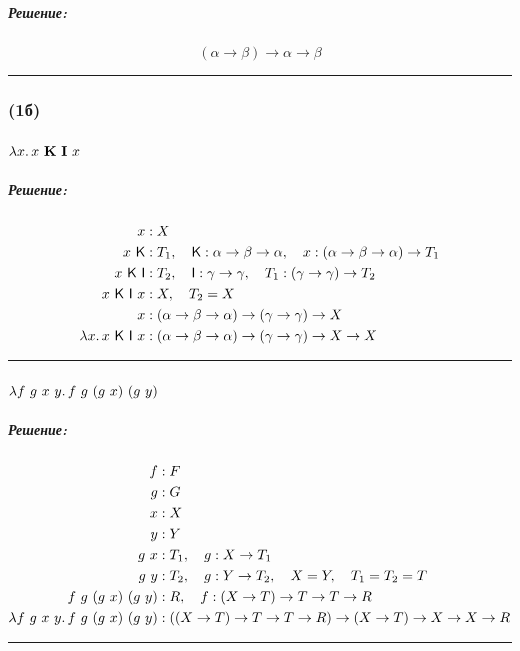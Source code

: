 \documentclass{article}
\newenvironment{proof}{\subparagraph{\hspace{-1em}Решение:\newline}}{\par\noindent\rule{\textwidth}{0.4pt}}
\newcommand{\term}[1]{\mathbf{#1}}
\newcommand{\ap}{~}
\begin{document}
    \begin{proof}
        \[
            (\alpha \to \beta) \to \alpha \to \beta
        \]
    \end{proof}

    \subsubsection{(1б)}

    \paragraph{} $\lambda x\ldotp x \ap \term{K} \ap \term{I} \ap x$

    \begin{proof}
        \[
            \begin{aligned}
                x & : X \\
                x\ \mathsf{K} & : T_1, \quad \mathsf{K} : \alpha \to \beta \to \alpha, \quad x : (\alpha \to \beta \to \alpha) \to T_1 \\
                x\ \mathsf{K}\ \mathsf{I} & : T_2, \quad \mathsf{I} : \gamma \to \gamma, \quad T_1 : (\gamma \to \gamma) \to T_2 \\
                x\ \mathsf{K}\ \mathsf{I}\ x & : X, \quad T_2 = X \\
                x & : (\alpha \to \beta \to \alpha) \to (\gamma \to \gamma) \to X \\
                \lambda x \ldotp x\ \mathsf{K}\ \mathsf{I}\ x & : (\alpha \to \beta \to \alpha) \to (\gamma \to \gamma) \to X \to X
            \end{aligned}
        \]
    \end{proof}

    \paragraph{} $\lambda f~g~x~y\ldotp f \ap g \ap (g \ap x) \ap (g \ap y)$

    \begin{proof}
        \[
            \begin{aligned}
                f & : F \\
                g & : G \\
                x & : X \\
                y & : Y \\
                g\ x & : T_1, \quad g : X \to T_1 \\
                g\ y & : T_2, \quad g : Y \to T_2, \quad X = Y, \quad T_1 = T_2 = T \\
                f\ g\ (g\ x)\ (g\ y) & : R, \quad f : (X \to T) \to T \to T \to R \\
                \lambda f~g~x~y \ldotp f\ g\ (g\ x)\ (g\ y) & : ((X \to T) \to T \to T \to R) \to (X \to T) \to X \to X \to R
            \end{aligned}
        \]
    \end{proof}
\end{document}
